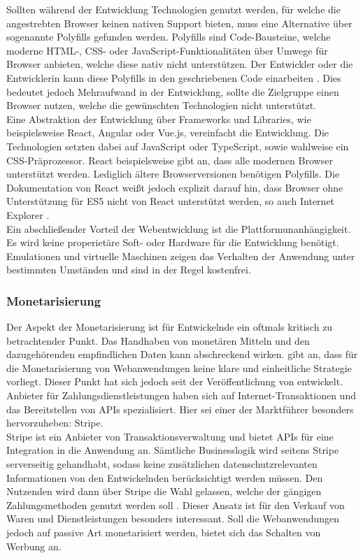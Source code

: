 \documentclass[a4paper]{scrartcl}
\begin{document}
Sollten während der Entwicklung Technologien genutzt werden, für welche die angestrebten Browser keinen nativen Support bieten, muss eine Alternative über sogenannte Polyfills gefunden werden. Polyfills sind Code-Bausteine, welche moderne HTML-, CSS- oder JavaScript-Funktionalitäten über Umwege für Browser anbieten, welche diese nativ nicht unterstützen. Der Entwickler oder die Entwicklerin kann diese Polyfills in den geschriebenen Code einarbeiten \autocite{Polyfills}. Dies bedeutet jedoch Mehraufwand in der Entwicklung, sollte die Zielgruppe einen Browser nutzen, welche die gewünschten Technologien nicht unterstützt. \\

Eine Abstraktion der Entwicklung über Frameworks und Libraries, wie beispielsweise React, Angular oder Vue.js, vereinfacht die Entwicklung. Die Technologien setzten dabei auf JavaScript oder TypeScript, sowie wahlweise ein CSS-Präprozessor. React beispielsweise gibt an, dass alle modernen Browser unterstützt werden. Lediglich ältere Browserversionen benötigen Polyfills. Die Dokumentation von React weißt jedoch explizit darauf hin, dass Browser ohne Unterstützung für ES5 nicht von React unterstützt werden, so auch Internet Explorer \autocite{ReactDOM}. \\

Ein abschließender Vorteil der Webentwicklung ist die Plattformunanhängigkeit. Es wird keine properietäre Soft- oder Hardware für die Entwicklung benötigt. Emulationen und virtuelle Maschinen zeigen das Verhalten der Anwendung unter bestimmten Umständen und sind in der Regel kostenfrei. \\

\subsubsection{Monetarisierung}
Der Aspekt der Monetarisierung ist für Entwickelnde ein oftmals kritisch zu betrachtender Punkt. Das Handhaben von monetären Mitteln und den dazugehörenden empfindlichen Daten kann abschreckend wirken. \textcite[28]{Jobe} gibt an, dass für die Monetarisierung von Webanwendungen keine klare und einheitliche Strategie vorliegt. Dieser Punkt hat sich jedoch seit der Veröffentlichung von \textcite{Jobe} entwickelt. Anbieter für Zahlungsdienstleistungen haben sich auf Internet-Transaktionen und das Bereitstellen von APIs spezialisiert. Hier sei einer der Marktführer besonders hervorzuheben: Stripe. \\
Stripe ist ein Anbieter von Transaktionsverwaltung und bietet APIs für eine Integration in die Anwendung an. Sämtliche Businesslogik wird seitens Stripe serverseitig gehandhabt, sodass keine zusätzlichen datenschutzrelevanten Informationen von den Entwickelnden berücksichtigt werden müssen. Den Nutzenden wird dann über Stripe die Wahl gelassen, welche der gängigen Zahlungsmethoden genutzt werden soll \autocite{Stripe}. Dieser Ansatz ist für den Verkauf von Waren und Dienstleistungen besonders interessant. Soll die Webanwendungen jedoch auf passive Art monetarisiert werden, bietet sich das Schalten von Werbung an. \\
\end{document}
